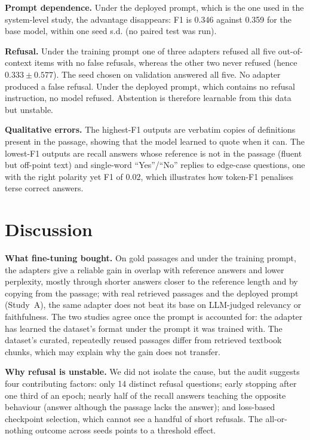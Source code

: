 \documentclass[conference]{IEEEtran}
\begin{document}
\textbf{Prompt dependence.} Under the deployed prompt, which is the one used in the system-level study, the advantage disappears: F1 is 0.346 against 0.359 for the base model, within one seed s.d. (no paired test was run).

\textbf{Refusal.} Under the training prompt one of three adapters refused all five out-of-context items with no false refusals, whereas the other two never refused (hence $0.333\pm0.577$). The seed chosen on validation answered all five. No adapter produced a false refusal. Under the deployed prompt, which contains no refusal instruction, no model refused. Abstention is therefore learnable from this data but unstable.

\textbf{Qualitative errors.} The highest-F1 outputs are verbatim copies of definitions present in the passage, showing that the model learned to quote when it can. The lowest-F1 outputs are recall answers whose reference is not in the passage (fluent but off-point text) and single-word ``Yes''/``No'' replies to edge-case questions, one with the right polarity yet F1 of 0.02, which illustrates how token-F1 penalises terse correct answers.

\section{Discussion}\label{sec:discussion}
\textbf{What fine-tuning bought.} On gold passages and under the training prompt, the adapters give a reliable gain in overlap with reference answers and lower perplexity, mostly through shorter answers closer to the reference length and by copying from the passage; with real retrieved passages and the deployed prompt (Study~A), the same adapter does not beat its base on LLM-judged relevancy or faithfulness. The two studies agree once the prompt is accounted for: the adapter has learned the dataset's format under the prompt it was trained with. The dataset's curated, repeatedly reused passages differ from retrieved textbook chunks, which may explain why the gain does not transfer.

\textbf{Why refusal is unstable.} We did not isolate the cause, but the audit suggests four contributing factors: only 14 distinct refusal questions; early stopping after one third of an epoch; nearly half of the recall answers teaching the opposite behaviour (answer although the passage lacks the answer); and loss-based checkpoint selection, which cannot see a handful of short refusals. The all-or-nothing outcome across seeds points to a threshold effect.
\end{document}
